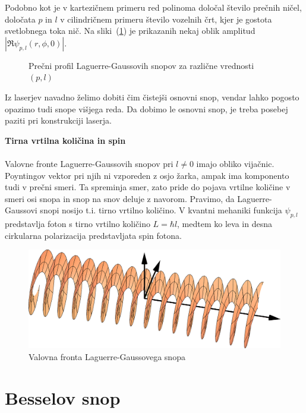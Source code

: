 Podobno kot je v kartezičnem primeru red polinoma določal število prečnih ničel,
določata $p$ in $l$ v cilindričnem primeru število vozelnih črt, kjer je gostota 
svetlobnega toka nič. Na sliki~(\ref{fig:Laguerrovi_presek})
je prikazanih nekaj oblik amplitud $|\Re\psi_{p,l}(r,\phi,0)|$.

\begin{figure}[h]
\centering
\def\svgwidth{110truemm} 

\caption{Prečni profil Laguerre-Gaussovih snopov za različne vrednosti $(p,l)$}
\label{fig:Laguerrovi_presek}
\end{figure}

Iz laserjev navadno želimo dobiti čim čistejši osnovni snop, vendar
lahko pogosto opazimo tudi snope višjega reda. Da dobimo le osnovni
snop, je treba posebej paziti pri konstrukciji laserja.

\begin{remark}{{\bf Tirna vrtilna količina in spin}}\\ \\
Valovne fronte Laguerre-Gaussovih snopov pri $l\ne0$ imajo obliko vijačnic. Poyntingov 
vektor pri njih ni vzporeden z osjo žarka, ampak ima komponento tudi v prečni smeri. Ta spreminja smer, 
zato pride do pojava vrtilne količine v smeri osi snopa in snop na snov deluje z navorom. 
Pravimo, da Laguerre-Gaussovi snopi nosijo t.i. tirno vrtilno količino. 
V kvantni mehaniki funkcija $\psi_{p,l}$ predstavlja foton s tirno vrtilno količino $L = \hbar l$, 
medtem ko leva in desna cirkularna polarizacija predstavljata spin fotona. 
\begin{figure}[h]
\centering
\includegraphics[width=10truecm]{slike/03_Laguerre_faza.png}
\caption{Valovna fronta Laguerre-Gaussovega snopa}
\label{fig:Laguerrova_fronta}
\end{figure}
\end{remark}

\section{Besselov snop}

